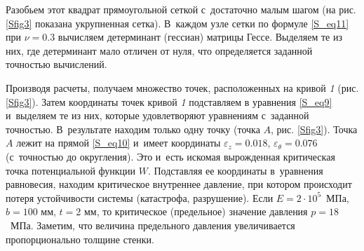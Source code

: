 Разобьем этот квадрат прямоугольной сеткой с~достаточно малым шагом (на рис. \ref{Sfig3} показана укрупненная сетка). В~каждом узле сетки по формуле \eqref{S_eq11} при  $ \nu = 0.3 $ вычисляем детерминант (гессиан) матрицы Гессе. 
Выделяем те из них, где детерминант мало отличен от нуля, что определяется заданной точностью вычислений.

Производя расчеты, получаем множество точек, расположенных на кривой {\sl 1} (рис. \ref{Sfig3}). 
Затем координаты точек кривой {\sl 1} подставляем в уравнения \eqref{S_eq9} и~выделяем те из них, которые удовлетворяют уравнениям с~заданной точностью. 
В~результате находим только одну точку (точка $A$, рис. \ref{Sfig3}). Точка $ A $ лежит на прямой \eqref{S_eq10} и~имеет координаты $ \varepsilon_{z}  = 0.018$, $\varepsilon_{\theta}  = 0.076 $ (с~точностью до округления). 
Это и~есть искомая вырожденная критическая точка потенциальной функции $ W $. 
Подставляя ее координаты в~уравнения равновесия, находим критическое внутреннее давление, при котором происходит потеря устойчивости системы (катастрофа, разрушение). 
Если  $ E = 2 \cdot 10^5 $~МПа, $ b = 100 $ мм,  $ t = 2 $ мм, то критическое (предельное) значение давления $ p = 18 $~МПа. Заметим, что величина предельного давления увеличивается пропорционально толщине стенки.


\pagebreak




